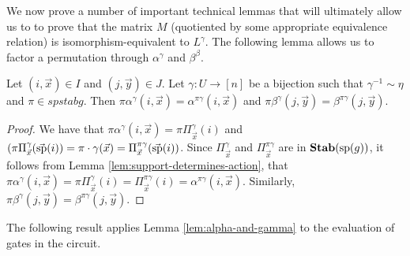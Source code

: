 \documentclass[../paper.tex]{subfiles}
\begin{document}


We now prove a number of important technical lemmas that will ultimately allow
us to to prove that the matrix $M$ (quotiented by some appropriate equivalence
relation) is isomorphism-equivalent to $L^{\gamma}$. The following lemma
allows us to factor a permutation through $\alpha^{\gamma}$ and $\beta^{\beta}$.

\begin{lem}
  \label{lem:alpha-and-gamma}
  Let $(i,\vec{x}) \in I$ and $(j, \vec{y}) \in J$. Let $\gamma: U \rightarrow
  [n]$ be a bijection such that $\gamma^{-1} \sim \eta$ and $\pi \in spstab{g}$.
  Then $\pi \alpha^{\gamma}(i, \vec{x}) = \alpha^{\pi \gamma}(i, \vec{x})$ and
  $\pi \beta^{\gamma}(j, \vec{y}) = \beta^{\pi \gamma}(j, \vec{y})$.
\end{lem}
\begin{proof}
  We have that $\pi \alpha^{\gamma}(i, \vec{x}) = \pi \Pi^{\gamma}_{\vec{x}}(i)$
  and $(\pi \Pi^{\gamma}_{\vec{x}}(\vec{\text{sp}}(i)) = \pi \cdot \gamma (\vec{x})
  = \Pi^{\pi \gamma}_{\vec{x}}(\vec{\text{sp}}(i))$. Since $\Pi^{\gamma}_{\vec{x}}$
  and $\Pi^{\pi \gamma}_{\vec{x}}$ are in $\text{\textbf{Stab}} (\text{sp} (g))$, it follows from Lemma
  \ref{lem:support-determines-action}, that $\pi \alpha^{\gamma}(i, \vec{x}) =
  \pi \Pi^{\gamma}_{\vec{x}} (i) = \Pi^{\pi \gamma}_{\vec{x}}(i) = \alpha^{\pi
    \gamma}(i, \vec{x})$. Similarly, $\pi \beta^{\gamma}(j, \vec{y}) =
  \beta^{\pi \gamma} (j, \vec{y})$.
\end{proof}

The following result applies Lemma \ref{lem:alpha-and-gamma} to the evaluation
of gates in the circuit.
\end{document}
